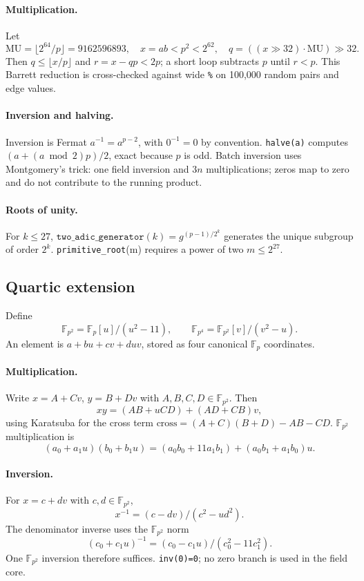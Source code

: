 \documentclass[11pt,a4paper]{article}
\newcommand{\yFp}{\mathbb{F}_p}
\newcommand{\yFpTwo}{\mathbb{F}_{p^2}}
\newcommand{\yFpFour}{\mathbb{F}_{p^4}}
\begin{document}
\paragraph{Multiplication.} Let
\[
\mathrm{MU}=\lfloor2^{64}/p\rfloor=9162596893,\quad
x=ab<p^2<2^{62},\quad
q=((x\gg32)\cdot\mathrm{MU})\gg32.
\]
Then $q\le\lfloor x/p\rfloor$ and $r=x-qp<2p$; a short loop subtracts $p$
until $r<p$. This Barrett reduction is cross-checked against wide \texttt{\%}
on 100,000 random pairs and edge values.

\paragraph{Inversion and halving.} Inversion is Fermat
$a^{-1}=a^{p-2}$, with $0^{-1}=0$ by convention. \texttt{halve(a)} computes
$(a+(a\bmod2)p)/2$, exact because $p$ is odd. Batch inversion uses
Montgomery's trick: one field inversion and $3n$ multiplications; zeros map to
zero and do not contribute to the running product.

\paragraph{Roots of unity.} For $k\le27$,
$\texttt{two\_adic\_generator}(k)=g^{(p-1)/2^k}$ generates the unique
subgroup of order $2^k$. \texttt{primitive\_root}(m) requires a power of two
$m\le2^{27}$.

\subsection{Quartic extension}

Define
\[
\yFpTwo=\yFp[u]/(u^2-11),\qquad
\yFpFour=\yFpTwo[v]/(v^2-u).
\]
An element is $a+bu+cv+duv$, stored as four canonical $\yFp$ coordinates.

\paragraph{Multiplication.} Write $x=A+Cv$, $y=B+Dv$ with
$A,B,C,D\in\yFpTwo$. Then
\[
xy=(AB+uCD)+(AD+CB)v,
\]
using Karatsuba for the cross term
$\mathrm{cross}=(A+C)(B+D)-AB-CD$. $\yFpTwo$ multiplication is
\[
(a_0+a_1u)(b_0+b_1u)
=(a_0b_0+11a_1b_1)+(a_0b_1+a_1b_0)u.
\]

\paragraph{Inversion.} For $x=c+dv$ with $c,d\in\yFpTwo$,
\[
x^{-1}=(c-dv)/(c^2-ud^2).
\]
The denominator inverse uses the $\yFpTwo$ norm
\[
(c_0+c_1u)^{-1}=(c_0-c_1u)/(c_0^2-11c_1^2).
\]
One $\yFpTwo$ inversion therefore suffices. \texttt{inv(0)=0}; no zero branch
is used in the field core.
\end{document}
